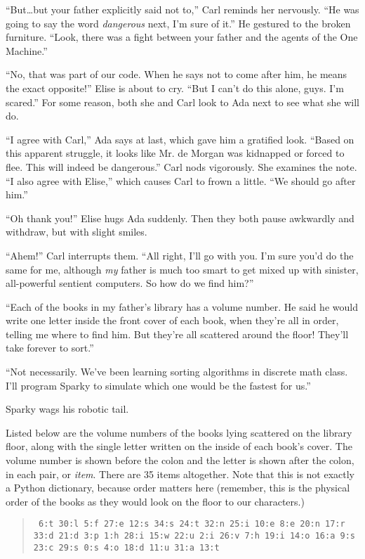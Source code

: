 \documentclass{article}
\begin{document}
``But\ldots but your father explicitly said not to,''
Carl reminds her nervously. ``He was going to say the
word \emph{dangerous} next, I'm sure of it.'' He
gestured to the broken furniture. ``Look, there was
a fight between your father and the agents of the One
Machine.''

``No, that was part of our code. When he says not to
come after him, he means the exact opposite!''
Elise is about to cry. ``But I can't do this alone, guys.
I'm scared.'' For some reason, both she and Carl
look to Ada next to see what she will do.

``I agree with Carl,'' Ada says at last, which gave him a
gratified look. ``Based on this apparent struggle, it
looks like Mr. de Morgan was kidnapped or forced to
flee. This will indeed be dangerous.'' Carl nods
vigorously.
She examines the note. ``I also agree with
Elise,'' which causes Carl to frown a little.
``We should go after him.''

``Oh thank you!'' Elise hugs Ada suddenly. Then they
both pause awkwardly and withdraw, but with slight
smiles.

``Ahem!'' Carl interrupts them. ``All right, I'll go
with you. I'm sure you'd do the same for me, although
\emph{my} father is much too smart to get mixed up
with sinister, all-powerful sentient computers. So
how do we find him?''

``Each of the books in my father's library has a
volume number. He said he would write one letter inside
the front cover of each book, when they're all in
order, telling me where to find him. But they're all
scattered around the floor! They'll take forever to sort.''

``Not necessarily. We've been learning sorting algorithms
in discrete math class. I'll program Sparky to simulate
which one would be the fastest for us.''

Sparky wags his robotic tail.

Listed below are the volume numbers of the books lying
scattered on the library floor, along with the single letter
written on the inside of each book's cover. The volume number is
shown before the colon and the letter is shown after the colon,
in each pair, or \emph{item}. There are 35 items
altogether. Note that this is not exactly a Python dictionary, because
order matters here (remember, this is the physical order of the books
as they would look on the floor to our characters.)

\begin{quote}
\texttt{
6:t 30:l 5:f 27:e 12:s 34:s 24:t 32:n 25:i 10:e 8:e 20:n 17:r
33:d 21:d 3:p 1:h 28:i 15:w 22:u 2:i 26:v 7:h 19:i 14:o 16:a
9:s 23:c 29:s 0:s 4:o 18:d 11:u 31:a 13:t
}
\end{quote}
\end{document}
